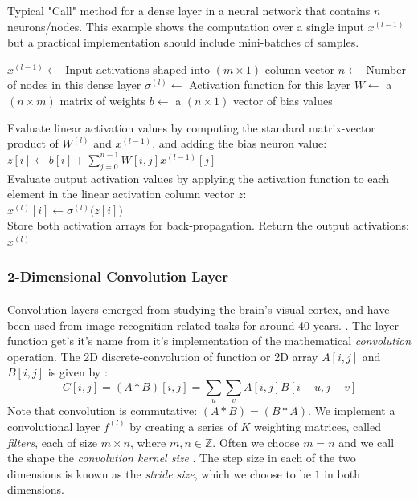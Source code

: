 \documentclass[12pt,letterpaper]{article}
\begin{document}
\begin{algorithm}[H]
\caption{Typical "Call" method for a dense layer in a neural network that contains $n$ neurons/nodes. This example shows the computation over a single input $x^{(l-1)}$ but a practical implementation should include mini-batches of samples.}
\label{alg-CallDense}

\begin{algorithmic}
\REQUIRE $x^{(l-1)} \leftarrow$ Input activations shaped into $(m \times 1)$ column vector
\REQUIRE $n \leftarrow$ Number of nodes in this dense layer
\REQUIRE $\sigma^{(l)} \leftarrow$ Activation function for this layer
\REQUIRE $W \leftarrow$ a $(n \times m)$ matrix of weights
\REQUIRE $b \leftarrow$ a $(n \times 1)$ vector of bias values

Evaluate linear activation values by computing the standard matrix-vector product of $W^{(l)}$ and $x^{(l-1)}$, and adding the bias neuron value:\\
$z[i] \leftarrow b[i] + \sum_{j=0}^{n-1} W[i,j] x^{(l-1)}[j]$ \\
Evaluate output activation values by applying the activation function to each element in the linear activation column vector $z$:\\
$x^{(l)}[i] \leftarrow \sigma^{(l)}\big( z[i] \big)$ \\

Store both activation arrays for back-propagation. Return the output activations:\\
\RETURN $x^{(l)}$

\end{algorithmic}
\end{algorithm}


\subsubsection{2-Dimensional Convolution Layer}
\label{subsubsec-Conv2DLayer}

\paragraph*{}Convolution layers emerged from studying the brain's visual cortex, and have been used from image recognition related tasks for around 40 years. \cite{Geron,Loy}. The layer function get's it's name from it's implementation of the mathematical \textit{convolution} operation. The 2D discrete-convolution of function or 2D array $A[i,j]$ and $B[i,j]$ is given by \cite{Goodfellow}:
\begin{equation}
\label{eqn-convolution}
C[i,j] = (A * B)[i,j] = \sum_{u}\sum_{v} A[i,j]B[i - u,j - v]
\end{equation}
Note that convolution is commutative: $(A * B) = (B * A)$. We implement a convolutional layer $f^{(l)}$ by creating a series of $K$ weighting matrices, called \textit{filters}, each of size $m \times n$, where $m,n \in \mathbb{Z}$. Often we choose $m = n$ and we call the shape the \textit{convolution kernel size} \cite{Loy, Goodfellow}. The step size in each of the two dimensions is known as the \textit{stride size}, which we choose to be $1$ in both dimensions.
\end{document}
